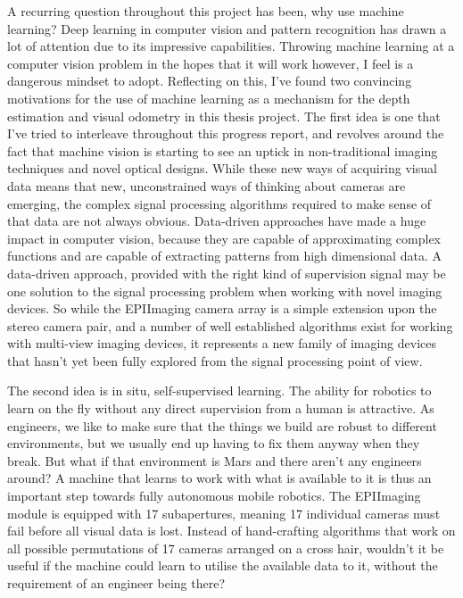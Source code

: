 \documentclass[openany]{book}
\begin{document}
A recurring question throughout this project has been, why use machine learning? Deep learning in computer vision and pattern recognition has drawn a lot of attention due to its impressive capabilities. Throwing machine learning at a computer vision problem in the hopes that it will work however, I feel is a dangerous mindset to adopt. Reflecting on this, I've found two convincing motivations for the use of machine learning as a mechanism for the depth estimation and visual odometry in this thesis project. The first idea is one that I've tried to interleave throughout this progress report, and revolves around the fact that machine vision is starting to see an uptick in non-traditional imaging techniques and novel optical designs. While these new ways of acquiring visual data means that new, unconstrained ways of thinking about cameras are emerging, the complex signal processing algorithms required to make sense of that data are not always obvious. Data-driven approaches have made a huge impact in computer vision, because they are capable of approximating complex functions and are capable of extracting patterns from high dimensional data. A data-driven approach, provided with the right kind of supervision signal may be one solution to the signal processing problem when working with novel imaging devices. So while the EPIImaging camera array is a simple extension upon the stereo camera pair, and a number of well established algorithms exist for working with multi-view imaging devices, it represents a new family of imaging devices that hasn't yet been fully explored from the signal processing point of view. 

The second idea is in situ, self-supervised learning. The ability for robotics to learn on the fly without any direct supervision from a human is attractive. As engineers, we like to make sure that the things we build are robust to different environments, but we usually end up having to fix them anyway when they break. But what if that environment is Mars and there aren't any engineers around? A machine that learns to work with what is available to it is thus an important step towards fully autonomous mobile robotics. The EPIImaging module is equipped with 17 subapertures, meaning 17 individual cameras must fail before all visual data is lost. Instead of hand-crafting algorithms that work on all possible permutations of 17 cameras arranged on a cross hair, wouldn't it be useful if the machine could learn to utilise the available data to it, without the requirement of an engineer being there?
\end{document}
